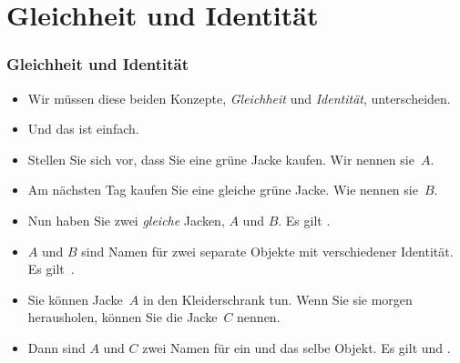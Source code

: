 \documentclass[aspectratio=169,mathserif,notheorems]{beamer}%
\begin{document}
\section{Gleichheit und Identität}%
%
\begin{frame}%
\frametitle{Gleichheit und Identität}%
\begin{itemize}%
\item Wir müssen diese beiden Konzepte, \emph{Gleichheit} und \emph{Identität}, unterscheiden.%
\item<2-> Und das ist einfach.%
%
\item<3-> Stellen Sie sich vor, dass Sie eine grüne Jacke kaufen. Wir nennen sie~$A$.%
%
\item<4-> Am nächsten Tag kaufen Sie eine gleiche grüne Jacke. Wie nennen sie~$B$.%
%
\item<5-> Nun haben Sie zwei \emph{gleiche} Jacken, $A$ und $B$. Es gilt .%
%
\item<6-> $A$ und $B$ sind Namen für zwei separate Objekte mit verschiedener Identität. Es gilt~.%
%
\item<7-> Sie können Jacke~$A$ in den Kleiderschrank tun. Wenn Sie sie morgen herausholen, können Sie die Jacke~$C$ nennen.%
%
\item<8-> Dann sind $A$ und $C$ zwei Namen für ein und das selbe Objekt. Es gilt  und .%
%
\end{itemize}%
\end{frame}%
%
\end{document}
